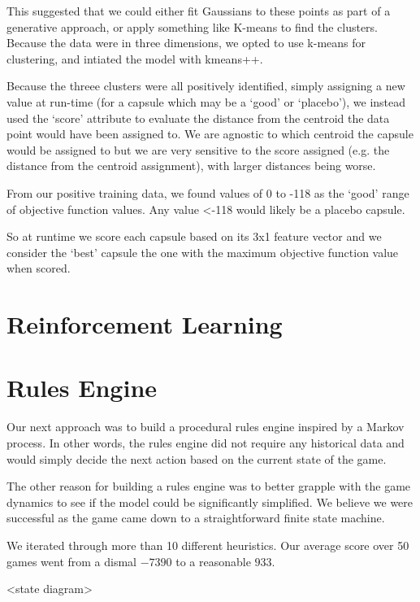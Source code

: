 \documentclass[11pt, oneside]{article}   	%
\begin{document}
This suggested that we could either fit Gaussians to these points as part of a generative approach, or apply something like K-means to find the clusters. Because the data were in three dimensions, we opted to use k-means for clustering, and intiated the model with kmeans++.

Because the threee clusters were all positively identified, simply assigning a new value at run-time (for a capsule which may be a `good' or `placebo'), we instead used the `score' attribute to evaluate the distance from the centroid the data point would have been assigned to. We are agnostic to which centroid the capsule would be assigned to but we are very sensitive to the score assigned (e.g. the distance from the centroid assignment), with larger distances being worse.

From our positive training data, we found values of 0 to -118 as the `good' range of objective function values. Any value <-118 would likely be a placebo capsule.

So at runtime we score each capsule based on its 3x1 feature vector and we consider the `best' capsule the one with the maximum objective function value when scored.

\section*{Reinforcement Learning}

\section*{Rules Engine}
Our next approach was to build a procedural rules engine inspired by a Markov process. In other words, the rules engine did not require any historical data and would simply decide the next action based on the current state of the game.

The other reason for building a rules engine was to better grapple with the game dynamics to see if the model could be significantly simplified. We believe we were successful as the game came down to a straightforward finite state machine. 

We iterated through more than 10 different heuristics. Our average score over 50 games went from a dismal $-7390$ to a reasonable $933$.

<state diagram>
\end{document}
